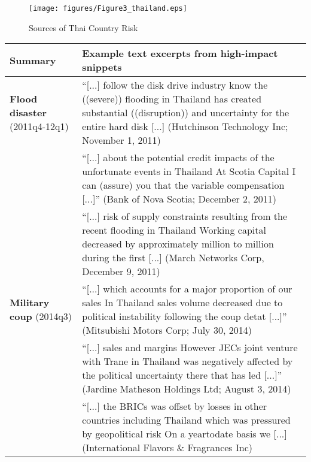 \documentclass[12pt,oneside,leqno]{article}
\begin{document}
\clearpage
\begin{figure}[!h]
\centering\caption{Sources of Thai Country Risk} \label{tab:thailand}
\texttt{[image: figures/Figure3\_thailand.eps]}
\end{figure}

\begin{minipage}[t]{.92\textwidth}
\footnotesize
\begin{tabular}{p{}p{}}
\toprule
Summary & Example text excerpts from high-impact snippets \\\midrule
\textbf{Flood disaster} \newline (2011q4-12q1) & ``[...] follow the disk drive industry know the ((severe)) flooding in {Thailand} has created substantial ((disruption)) and {uncertainty} for the entire hard disk [...] (Hutchinson Technology Inc; November 1, 2011) \\
& ``[...] about the potential credit impacts of the unfortunate events in {Thailand} At Scotia Capital I can (assure) you that the {variable} compensation [...]'' (Bank of Nova Scotia; December 2, 2011) \\
& ``[...] {risk} of supply constraints resulting from the recent flooding in {Thailand} Working capital decreased by approximately million to million during the first [...] (March Networks Corp, December 9, 2011) \\\addlinespace
\textbf{Military coup} \newline (2014q3) & ``[...] which accounts for a major proportion of our sales In {Thailand} sales volume decreased due to political {instability} following the coup detat [...]'' (Mitsubishi Motors Corp; July 30, 2014) \\
& ``[...] sales and margins However JECs joint venture with Trane in {Thailand} was negatively affected by the political {uncertainty} there that has led [...]'' (Jardine Matheson Holdings Ltd; August 3, 2014) \\
& ``[...] the BRICs was offset by losses in other countries including {Thailand} which was pressured by geopolitical {risk} On a yeartodate basis we [...] (International Flavors \& Fragrances Inc) \\\bottomrule
\end{tabular}
\end{minipage}
\vspace{.05in}
\end{document}

